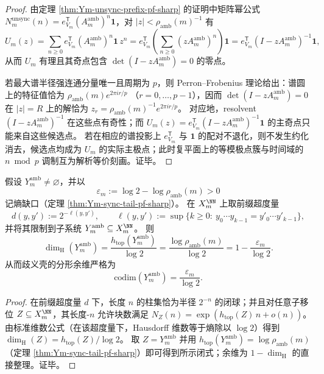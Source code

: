 \begin{proof}
由定理 \ref{thm:Ym-unsync-prefix-pf-sharp} 的证明中矩阵幂公式
\(
N_m^{\mathrm{unsync}}(n)=e_{V_m}^{\mathsf T}(A_m^{\mathrm{amb}})^n\mathbf 1
\)，对 \(|z|<\rho_{\mathrm{amb}}(m)^{-1}\) 有
\[
U_m(z)=\sum_{n\ge 0}e_{V_m}^{\mathsf T}(A_m^{\mathrm{amb}})^n\mathbf 1\,z^n
=e_{V_m}^{\mathsf T}\left(\sum_{n\ge 0}(zA_m^{\mathrm{amb}})^n\right)\mathbf 1
=e_{V_m}^{\mathsf T}(I-zA_m^{\mathrm{amb}})^{-1}\mathbf 1,
\]
从而 \(U_m\) 有理且其奇点包含 \(\det(I-zA_m^{\mathrm{amb}})=0\) 的零点。
\par
若最大谱半径强连通分量唯一且周期为 \(p\)，则 Perron--Frobenius 理论给出：谱圆上的特征值恰为
\(
\rho_{\mathrm{amb}}(m)e^{2\pi i r/p}
\)
（\(r=0,\dots,p-1\)），因而
\(
\det(I-zA_m^{\mathrm{amb}})=0
\)
在 \(|z|=R\) 上的解恰为
\(
z_r=\rho_{\mathrm{amb}}(m)^{-1}e^{2\pi i r/p}
\)。
对应地，resolvent \((I-zA_m^{\mathrm{amb}})^{-1}\) 在这些点有奇性；而 \(U_m(z)=e_{V_m}^{\mathsf T}(I-zA_m^{\mathrm{amb}})^{-1}\mathbf 1\) 的主奇点只能来自这些候选点。
若在相应的谱投影上 \(e_{V_m}^{\mathsf T}\) 与 \(\mathbf 1\) 的配对不退化，则不发生约化消去，候选点均成为 \(U_m\) 的实际主极点；此时复平面上的等模极点簇与时间域的 \(n\bmod p\) 调制互为解析等价刻画。证毕。
\end{proof}

\begin{corollary}[歧义壳的 Hausdorff 维数与余维闭式：\texorpdfstring{$\mathrm{codim}=\varepsilon_m/\log 2$}{codim=eps/log2}]\label{cor:Ym-amb-hausdorff-codim}
假设 \(Y_m^{\mathrm{amb}}\neq\varnothing\)，并以
\[
\varepsilon_m:=\log 2-\log\rho_{\mathrm{amb}}(m)>0
\]
记熵缺口（定理 \ref{thm:Ym-sync-tail-pf-sharp}）。
在 \(X_m^{\NN}\) 上取前缀超度量
\[
d(y,y'):=2^{-\ell(y,y')},
\qquad
\ell(y,y'):=\sup\{k\ge 0:\ y_0\cdots y_{k-1}=y'_0\cdots y'_{k-1}\},
\]
并将其限制到子系统 \(Y_m^{\mathrm{amb}}\subseteq X_m^{\NN}\)。
则
\[
\dim_{\mathrm H}(Y_m^{\mathrm{amb}})
=\frac{h_{\mathrm{top}}(Y_m^{\mathrm{amb}})}{\log 2}
=\frac{\log\rho_{\mathrm{amb}}(m)}{\log 2}
=1-\frac{\varepsilon_m}{\log 2}.
\]
从而歧义壳的分形余维严格为
\[
\mathrm{codim}(Y_m^{\mathrm{amb}})=\frac{\varepsilon_m}{\log 2}.
\]
\end{corollary}

\begin{proof}
在前缀超度量 \(d\) 下，长度 \(n\) 的柱集恰为半径 \(2^{-n}\) 的闭球；并且对任意子移位 \(Z\subseteq X_m^{\NN}\)，其长度-\(n\) 允许块数满足
\(
N_Z(n)=\exp(h_{\mathrm{top}}(Z)\,n+o(n))
\)。
由标准维数公式（在该超度量下，Hausdorff 维数等于熵除以 \(\log 2\)）得到
\(
\dim_{\mathrm H}(Z)=h_{\mathrm{top}}(Z)/\log 2
\)。
取 \(Z=Y_m^{\mathrm{amb}}\) 并用 \(h_{\mathrm{top}}(Y_m^{\mathrm{amb}})=\log\rho_{\mathrm{amb}}(m)\)（定理 \ref{thm:Ym-sync-tail-pf-sharp}）即可得到所示闭式；余维为 \(1-\dim_{\mathrm H}\) 的直接整理。证毕。
\end{proof}


